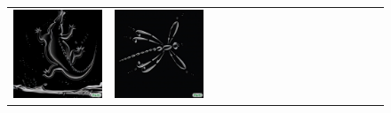 \begin{figure}[ht!]
\begin{adjustwidth}{-0.8in}{-0.5in}
\begin{tabular}{cccccccccccccccccccc}
\multicolumn{3}{c}{\includegraphics[width=\twobytwocolwidth\textwidth]{figures/cherries/water_crocodile.jpg}} &
\multicolumn{3}{c}{\includegraphics[width=\twobytwocolwidth\textwidth]{figures/cherries/water_dragonfly.jpg}} &&

\end{tabular}
\end{adjustwidth}
\end{figure}
